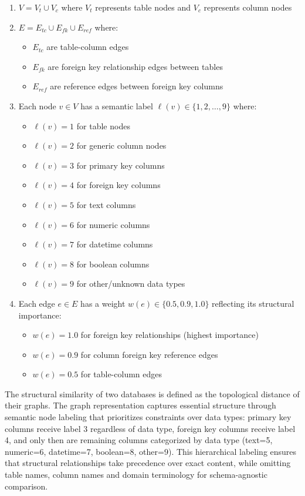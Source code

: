 \begin{enumerate}
    \item $V = V_t \cup V_c$ where $V_t$ represents table nodes and $V_c$ represents column nodes
    \item $E = E_{tc} \cup E_{fk} \cup E_{ref}$ where:
        \begin{itemize}
            \item $E_{tc}$ are table-column edges
            \item $E_{fk}$ are foreign key relationship edges between tables
            \item $E_{ref}$ are reference edges between foreign key columns
        \end{itemize}
    \item Each node $v \in V$ has a semantic label $\ell(v) \in \{1, 2, \ldots, 9\}$ where:
        \begin{itemize}
            \item $\ell(v) = 1$ for table nodes
            \item $\ell(v) = 2$ for generic column nodes
            \item $\ell(v) = 3$ for primary key columns
            \item $\ell(v) = 4$ for foreign key columns
            \item $\ell(v) = 5$ for text columns
            \item $\ell(v) = 6$ for numeric columns
            \item $\ell(v) = 7$ for datetime columns
            \item $\ell(v) = 8$ for boolean columns
            \item $\ell(v) = 9$ for other/unknown data types
        \end{itemize}
    \item Each edge $e \in E$ has a weight $w(e) \in \{0.5, 0.9, 1.0\}$ reflecting its structural importance:
        \begin{itemize}
            \item $w(e) = 1.0$ for foreign key relationships (highest importance)
            \item $w(e) = 0.9$ for column foreign key reference edges
            \item $w(e) = 0.5$ for table-column edges
        \end{itemize}
\end{enumerate}

The structural similarity of two databases is defined as the topological
distance of their graphs. The graph representation captures essential
structure through semantic node labeling that prioritizes constraints over data
types: primary key columns receive label 3 regardless of data
type, foreign key columns receive label 4, and only then are remaining columns
categorized by data type (text=5, numeric=6, datetime=7, boolean=8, other=9).
This hierarchical labeling ensures that structural relationships take
precedence over exact content, while omitting table names, column names and
domain terminology for schema-agnostic comparison.

